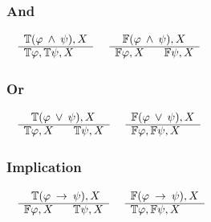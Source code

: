 \documentclass{article}
\begin{document}
		\subsubsection*{And}
			$\begin{array}{rl}
				& \mathbb{T}(\varphi \: \wedge \: \psi), X \\
			      \cline{2-2}
			      & \mathbb{T}\varphi, \mathbb{T}\psi, X
			\end{array}$
			\:\:\:\:\:\:\:\:\:\:\:\:\:\:\:\:\:\:\:\:\:\:\:\:\:\:\:\:\:\:\:\:\:\:\:
			$\begin{array}{rl}
				& \:\:\: \mathbb{F}(\varphi \: \wedge \: \psi), X \\
			      \cline{2-2}
			      & \mathbb{F}\varphi, X \:\:\:\:\:\:\:\: \mathbb{F}\psi, X
			\end{array}$

		\subsubsection*{Or}
			$\begin{array}{rl}
				& \:\:\: \mathbb{T}(\varphi \: \vee \: \psi), X \\
			      \cline{2-2}
			      & \mathbb{T}\varphi, X \:\:\:\:\:\:\:\: \mathbb{T}\psi, X
			\end{array}$
			\:\:\:\:\:\:\:\:\:\:\:\:\:\:\:\:\:\:\:\:\:\:\:\:\:\:\:\:\:\:\:\:
			$\begin{array}{rl}
				& \mathbb{F}(\varphi \: \vee \: \psi), X \\
			      \cline{2-2}
			      & \mathbb{F}\varphi, \mathbb{F}\psi, X
			\end{array}$

		\subsubsection*{Implication}
			$\begin{array}{rl}
				& \:\:\: \mathbb{T}(\varphi \: \rightarrow \: \psi), X \\
			      \cline{2-2}
			      & \mathbb{F}\varphi, X \:\:\:\:\:\:\:\: \mathbb{T}\psi, X
			\end{array}$
			\:\:\:\:\:\:\:\:\:\:\:\:\:\:\:\:\:\:\:\:\:\:\:\:\:\:\:\:\:\:\:\:\:\:
			$\begin{array}{rl}
				& \mathbb{F}(\varphi \: \rightarrow \: \psi), X \\
			      \cline{2-2}
			      & \mathbb{T}\varphi, \mathbb{F}\psi, X
			\end{array}$
\end{document}
